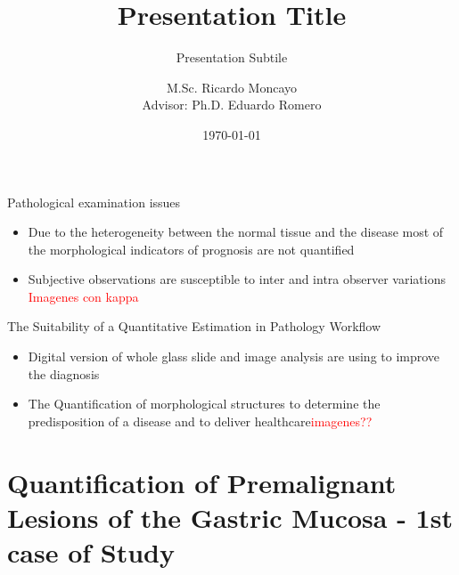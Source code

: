 \documentclass[usenames,dvipsnames]{beamer}
\author{M.Sc. Ricardo Moncayo\\Advisor: Ph.D. Eduardo Romero}
\title{Presentation Title}
\subtitle{Presentation Subtile}
\institute{Departamento Ingeniería \\ Eléctrica}
\date{\today}
\begin{document}
\begin{frame}[plain]
\maketitle
\small
{\centering\itshape \par}
\par\medskip

\end{frame}


\begin{frame}{Pathological examination issues}
	\begin{itemize}
	 \item Due to the heterogeneity between the normal tissue and the disease most of the morphological indicators of prognosis are not quantified
     \pause
	 \item Subjective observations are susceptible to inter and intra observer variations
      \textcolor{red}{Imagenes con kappa}	 
	 
	\end{itemize}
\end{frame}

\begin{frame}{The Suitability of a Quantitative Estimation in Pathology Workflow}
 \begin{itemize}
  \item Digital version of whole glass slide and image analysis are using to improve the diagnosis
  \pause

  \item The Quantification of morphological structures to determine the predisposition of a disease and to deliver healthcare\textcolor{red}{imagenes??}
  
  
  
 \end{itemize}
\end{frame}

\section{Quantification of Premalignant Lesions of the Gastric Mucosa - 1st case of Study}
\end{document}

